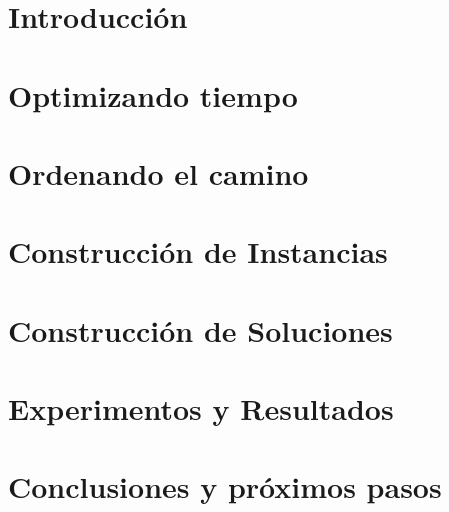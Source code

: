 \documentclass[11pt,a4paper,twoside]{tesis}
\begin{document}

\def\autor{Ignacio Fernández Oromendia}
\def\tituloTesis{Optimizaci\'on de recorridos para la recolecci\'on de reciclables}
\def\runtitulo{Optimizaci\'on de recorridos para la recolecci\'on de reciclables}
\def\runtitle{Optimizing routes for recyclable collection}
\def\director{Paula Zabala}
\def\codirector{Isabel Mendez Díaz}
\def\lugar{Buenos Aires, 2025}


\frontmatter
\pagestyle{empty}


\cleardoublepage

\cleardoublepage

\cleardoublepage

\cleardoublepage
\tableofcontents

\mainmatter
\pagestyle{headings}


\chapter{Introducción}


\chapter{Optimizando tiempo}


\chapter{Ordenando el camino}


\chapter{Construcción de Instancias}


\chapter{Construcción de Soluciones}


\chapter{Experimentos y Resultados}

\chapter{Conclusiones y próximos pasos}

\backmatter
%
\end{document}

